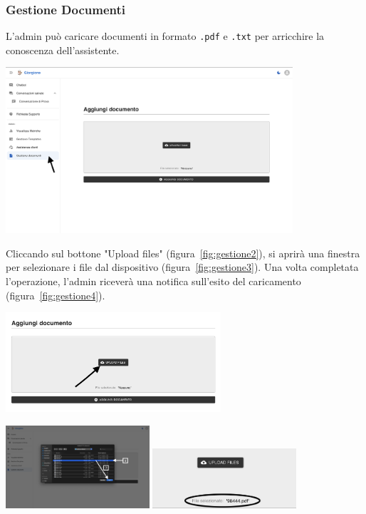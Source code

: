 \subsubsection{Gestione Documenti}
L'admin può caricare documenti in formato \texttt{.pdf} e \texttt{.txt} per arricchire la conoscenza dell'assistente.
\begin{center}
    \includegraphics[width=0.8\textwidth]{./img/PaginaGestioneDocumenti1.png}
    \label{fig:gestione1}
\end{center}

Cliccando sul bottone "Upload files" (figura~\ref{fig:gestione2}), si aprirà una finestra per selezionare i file dal dispositivo (figura~\ref{fig:gestione3}). Una volta completata l'operazione, l'admin riceverà una notifica sull'esito del caricamento (figura~\ref{fig:gestione4}).

\begin{center}
    \includegraphics[width=0.6\textwidth]{./img/PaginaGestioneDocumenti2.png}
    \label{fig:gestione2}
\end{center}

\begin{center}
    \includegraphics[width=0.4\textwidth]{./img/PaginaGestioneDocumenti3.png}
    \hspace{0.05\textwidth}
    \includegraphics[width=0.4\textwidth]{./img/GestioneDocumenti4.png}
    \label{fig:gestione3}
\end{center}

